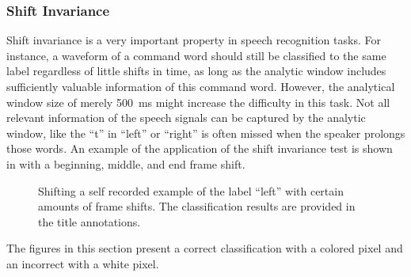 \subsubsection{Shift Invariance}
Shift invariance is a very important property in speech recognition tasks. 
For instance, a waveform of a command word should still be classified to the same label regardless of little shifts in time, as long as the analytic window includes sufficiently valuable information of this command word.
However, the analytical window size of merely \SI{500}{\milli\second} might increase the difficulty in this task.
Not all relevant information of the speech signals can be captured by the analytic window, like the \enquote{t} in \enquote{left} or \enquote{right} is often missed when the speaker prolongs those words.
An example of the application of the shift invariance test is shown in  with a beginning, middle, and end frame shift.
\begin{figure}[!ht]
  \centering
    \quad
  \caption{Shifting a self recorded example of the label \enquote{left} with certain amounts of frame shifts. The classification results are provided in the title annotations.}
  \label{fig:exp_details_tb_shift_left}
\end{figure}
\FloatBarrier
\noindent
The figures in this section present a correct classification with a colored pixel and an incorrect with a white pixel.
